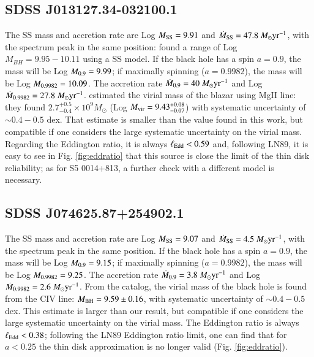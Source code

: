 \documentclass{aa}
\begin{document}
\subsection{SDSS J013127.34-032100.1} 

The SS mass and accretion rate are Log $M_{\rm SS} = 9.91$ and $\dot{M}_{\rm SS} = 47.8\ M_{\odot} \text{yr}^{-1}$, with the spectrum peak in the same position: \citet{Ghi2015} found a range of Log $M_{BH} = 9.95 - 10.11$ using a SS model. If the black hole has a spin $a = 0.9$, the mass will be Log $M_{\rm 0.9} = 9.99$; if maximally spinning ($a = 0.9982$), the mass will be Log $M_{\rm 0.9982} = 10.09$. The accretion rate $\dot{M}_{\rm 0.9} = 40\ M_{\odot} \text{yr}^{-1}$ and Log $\dot{M}_{\rm 0.9982} = 27.8\ M_{\odot} \text{yr}^{-1}$. \citet{Yietal} estimated the virial mass of the blazar using MgII line: they found $2.7^{+0.5}_{-0.4} \times 10^{9} M_{\odot}$ (Log $M_{\rm vir} = 9.43^{+0.08}_{-0.07}$) with systematic uncertainty of $\sim 0.4-0.5$ dex. That estimate is smaller than the value found in this work, but compatible if one considers the large systematic uncertainty on the virial mass. Regarding the Eddington ratio, it is always $\ell_{\rm Edd} < 0.59$ and, following LN89, it is easy to see in Fig. \ref{fig:eddratio} that this source is close the limit of the thin disk reliability; as for S5 0014+813, a further check with a different model is necessary.



\subsection{SDSS J074625.87+254902.1}
The SS mass and accretion rate are Log $M_{\rm SS} = 9.07$ and $\dot{M}_{\rm SS} = 4.5\ M_{\odot} \text{yr}^{-1}$, with the spectrum peak in the same position. If the black hole has a spin $a = 0.9$, the mass will be Log $M_{\rm 0.9} = 9.15$; if maximally spinning ($a = 0.9982$), the mass will be Log $M_{\rm 0.9982} = 9.25$. The accretion rate $\dot{M}_{\rm 0.9} = 3.8\ M_{\odot} \text{yr}^{-1}$ and Log $\dot{M}_{\rm 0.9982} = 2.6\ M_{\odot} \text{yr}^{-1}$. From the \citet{Shenetal11} catalog, the virial mass of the black hole is found from the CIV line: $M_{\rm BH} = 9.59 \pm 0.16$, with systematic uncertainty of $\sim 0.4-0.5$ dex. This estimate is larger than our result, but compatible if one considers the large systematic uncertainty on the virial mass. The Eddington ratio is always $\ell_{\rm Edd} < 0.38$; following the LN89 Eddington ratio limit, one can find that for $a < 0.25$ the thin disk approximation is no longer valid (Fig. \ref{fig:eddratio}).
\end{document}
